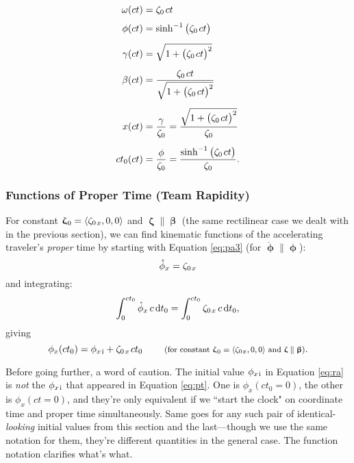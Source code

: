 \documentclass[12pt]{article}
\newcommand{\dd}[1]{\mathrm{d}#1}
\newcommand{\vvbeta}{\bm{\upbeta}}
\newcommand{\vvphi}{\bm{\upphi}}
\newcommand{\vvzeta}{\bm{\upzeta}}
\begin{document}
\begin{equation*}
\begin{aligned}
\omega (ct) &= \zeta_0 \mkern2mu ct \\[3pt]
\phi (ct) &= \sinh^{-1} \big( \zeta_0 \mkern2mu ct \big) \\[5pt]
\gamma (ct) &= \sqrt{1 + \big( \zeta_0 \mkern2mu ct \big)^2} \\[5pt]
\beta (ct) &= \dfrac{\zeta_0 \mkern2mu ct}{\sqrt{1 + \big( \zeta_0 \mkern2mu ct \big)^2}} \\[5pt]
x (ct) &= \dfrac{ \gamma }{ \zeta_0} = \dfrac{\sqrt{1 + \big( \zeta_0 \mkern2mu ct \big)^2}}{ \zeta_0} \\[5pt]
ct_0 (ct) &= \dfrac{ \phi }{ \zeta_0} = \dfrac{\sinh^{-1} \big( \zeta_0 \mkern2mu ct \big)}{ \zeta_0}.
\end{aligned}
\end{equation*}


\subsubsection{Functions of Proper Time (Team Rapidity)}

For constant $\vvzeta_{\mkern1mu 0} = \langle \zeta_{0 \mkern2mu x} , 0, 0 \rangle$ and $\vvzeta \parallel \vvbeta$ (the same rectilinear case we dealt with in the previous section), we can find kinematic functions of the accelerating traveler's \emph{proper} time by starting with Equation \ref{eq:pa3} (for $\mathring{\vvphi} \parallel \vvphi$):
\begin{equation*}
\mathring{\phi}_x = \zeta_{0 \mkern2mu x}
\end{equation*}
and integrating:
\begin{equation*}
\int_0^{ct_0} \mathring{\phi}_x \, c \, \dd t_0 = \int_0^{ct_0}  \zeta_{0 \mkern2mu x} \, c \, \dd t _0 ,
\end{equation*}
giving
\begin{equation}\label{eq:ra}
\phi_x (ct_0) = \phi_{x \mkern2mu \textrm{i} } + \zeta_{0 \mkern2mu x} \mkern2mu ct_0 \qquad \textrm{\footnotesize{ (for constant $\vvzeta_{\mkern1mu 0} = \langle \zeta_{0 \mkern1mu x} , 0, 0 \rangle$ and $\vvzeta \parallel \vvbeta$)}}.
\end{equation}

Before going further, a word of caution. The initial value $\phi_{x \mkern2mu \textrm{i} }$ in Equation \ref{eq:ra} is \emph{not} the $\phi_{x \mkern2mu \textrm{i} }$ that appeared in Equation \ref{eq:pt}. One is $\phi_x (ct_0 = 0)$, the other is $\phi_x (ct = 0)$, and they're only equivalent if we ``start the clock" on coordinate time and proper time simultaneously. Same goes for any such pair of identical-\emph{looking} initial values from this section and the last---though we use the same notation for them, they're different quantities in the general case. The function notation clarifies what's what.
\end{document}

